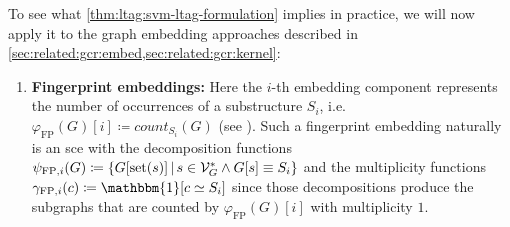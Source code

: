 To see what \cref{thm:ltag:svm-ltag-formulation} implies in practice, we will now apply it to the graph embedding approaches described in \cref{sec:related:gcr:embed,sec:related:gcr:kernel}:
\begin{enumerate}[label=\textbf{\arabic*.},ref={\arabic*}]
	\item \textbf{Fingerprint embeddings:}\label{itm:ltag:fingerprint-lta-formulation}
		Here the $i$-th embedding component represents the number of occurrences of a substructure $S_i$, i.e.\ ${\varphi}_{\mathrm{FP}}(G)[i] \coloneqq \mathit{count}_{S_i}(G)$ (see ).
		Such a fingerprint embedding naturally is an \ac{sce} with the decomposition functions $\psi_{\mathrm{FP}, i}(G) \coloneqq \{ G[\operatorname{set}(s)]\, |\, s \in \mathcal{V}_G^{*} \land G[s] \equiv S_i \}$ and the multiplicity functions $\gamma_{\mathrm{FP}, i}(c) \coloneqq \mathbbm{1}[c \simeq S_i]$ since those decompositions produce the subgraphs that are counted by ${\varphi}_{\mathrm{FP}}(G)[i]$ with multiplicity $1$. %


\end{enumerate}
